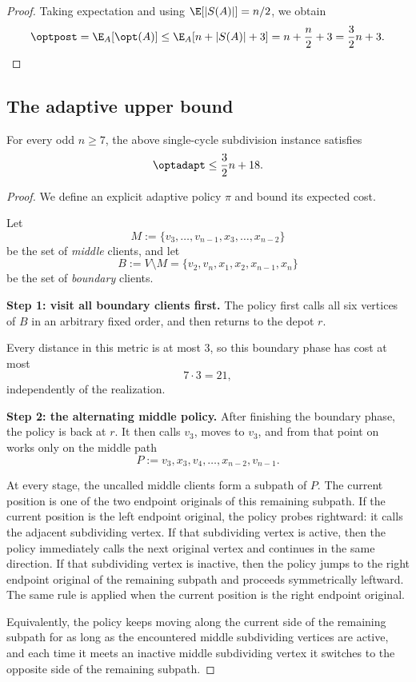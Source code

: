 \begin{proof}
Taking expectation and using $\E[|S(A)|]=n/2$, we obtain
\[
\optpost
=\E_A[\opt(A)]
\le
\E_A[n+|S(A)|+3]
=
 n+\frac n2+3
=
\frac32 n+3.
\]
\end{proof}

\subsection*{The adaptive upper bound}

\begin{proposition}\label{prop:single-adapt}
For every odd $n\ge 7$, the above single-cycle subdivision instance satisfies
\[
\optadapt\le \frac32 n+18.
\]
\end{proposition}

\begin{proof}
We define an explicit adaptive policy $\pi$ and bound its expected cost.

Let
\[
M:=\{v_3,\dots,v_{n-1},x_3,\dots,x_{n-2}\}
\]
be the set of \emph{middle} clients, and let
\[
B:=V\setminus M=\{v_2,v_n,x_1,x_2,x_{n-1},x_n\}
\]
be the set of \emph{boundary} clients.

\medskip
\noindent\textbf{Step 1: visit all boundary clients first.}
The policy first calls all six vertices of $B$ in an arbitrary fixed order, and then returns to the depot $r$.

Every distance in this metric is at most $3$, so this boundary phase has cost at most
\[
7\cdot 3=21,
\]
independently of the realization.

\medskip
\noindent\textbf{Step 2: the alternating middle policy.}
After finishing the boundary phase, the policy is back at $r$. It then calls $v_3$, moves to $v_3$, and from that point on works only on the middle path
\[
P:=v_3,x_3,v_4,\dots,x_{n-2},v_{n-1}.
\]

At every stage, the uncalled middle clients form a subpath of $P$. The current position is one of the two endpoint originals of this remaining subpath. If the current position is the left endpoint original, the policy probes rightward: it calls the adjacent subdividing vertex. If that subdividing vertex is active, then the policy immediately calls the next original vertex and continues in the same direction. If that subdividing vertex is inactive, then the policy jumps to the right endpoint original of the remaining subpath and proceeds symmetrically leftward. The same rule is applied when the current position is the right endpoint original.

Equivalently, the policy keeps moving along the current side of the remaining subpath for as long as the encountered middle subdividing vertices are active, and each time it meets an inactive middle subdividing vertex it switches to the opposite side of the remaining subpath.


\end{proof}
